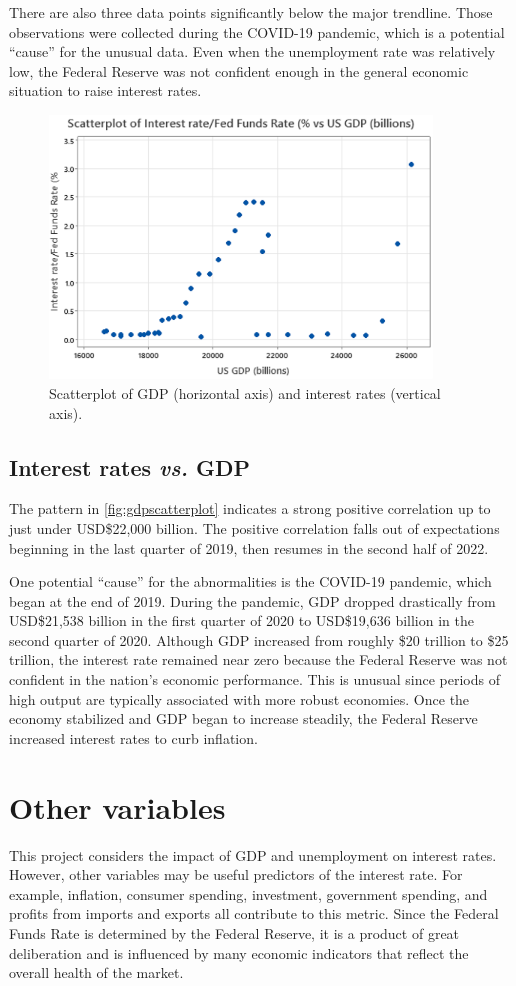 \documentclass[12pt]{article}
\begin{document}
There are also three data points significantly below the major trendline. Those observations were collected during the COVID-19 pandemic, which is a potential ``cause'' for the unusual data. Even when the unemployment rate was relatively low, the Federal Reserve was not confident enough in the general economic situation to raise interest rates.
\begin{figure}[ht]
\begin{center}
\includegraphics[width=4in]{images/gdp-scatterplot.png}
\end{center}
\caption{Scatterplot of GDP (horizontal axis) and interest rates (vertical axis).
\label{fig:gdpscatterplot}}
\end{figure}
\subsection{Interest rates \emph{vs.} GDP}
The pattern in \autoref{fig:gdpscatterplot} indicates a strong positive correlation up to just under USD\$22,000 billion. The positive correlation falls out of expectations beginning in the last quarter of 2019, then resumes in the second half of 2022.

One potential ``cause'' for the abnormalities is the COVID-19 pandemic, which began at the end of 2019. During the pandemic, GDP dropped drastically from USD\$21,538 billion in the first quarter of 2020 to USD\$19,636 billion in the second quarter of 2020. Although GDP increased from roughly \$20 trillion to \$25 trillion, the interest rate remained near zero because the Federal Reserve was not confident in the nation's economic performance. This is unusual since periods of high output are typically associated with more robust economies. Once the economy stabilized and GDP began to increase steadily, the Federal Reserve increased interest rates to curb inflation. 
\section{Other variables}
This project considers the impact of GDP and unemployment on interest rates. However, other variables may be useful predictors of the interest rate. For example, inflation, consumer spending, investment, government spending, and profits from imports and exports all contribute to this metric. Since the Federal Funds Rate is determined by the Federal Reserve, it is a product of great deliberation and is influenced by many economic indicators that reflect the overall health of the market.
\end{document}
